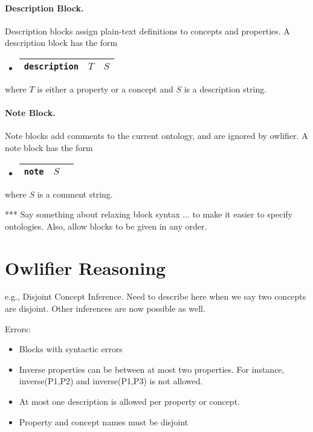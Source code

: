 \documentclass[11pt,onecolumn]{article}
\newcommand{\owlifier}{\textsf{owlifier}}
\begin{document}
\paragraph{Description Block.} Description blocks assign plain-text
definitions to concepts and properties. A description block has the
form
\begin{itemize}
\item[]
  \begin{tabular}{|l|l|l|}\hline \texttt{description} & $T$ & $S$
\\ \hline
  \end{tabular}
\end{itemize}
where $T$ is either a property or a concept and $S$ is a description
string.

\paragraph{Note Block.} Note blocks add comments to the current
ontology, and are ignored by \owlifier.  A note block has the form
\begin{itemize}
\item[]
  \begin{tabular}{|l|l|l|}\hline \texttt{note} & $S$
\\ \hline
  \end{tabular}
\end{itemize}
where $S$ is a comment string.

*** Say something about relaxing block syntax ... to make it easier to
specify ontologies. Also, allow blocks to be given in any order.

\section{\textsf{Owlifier} Reasoning}

e.g., Disjoint Concept Inference. Need to describe here when we say
two concepts are disjoint. Other inferences are now possible as well.

Errors:
\begin{itemize}
\item Blocks with syntactic errors
\item Inverse properties can be between at most two properties. For
  instance, inverse(P1,P2) and inverse(P1,P3) is not allowed.
\item At most one description is allowed per property or concept.
\item Property and concept names must be disjoint
\end{itemize}
\end{document}
